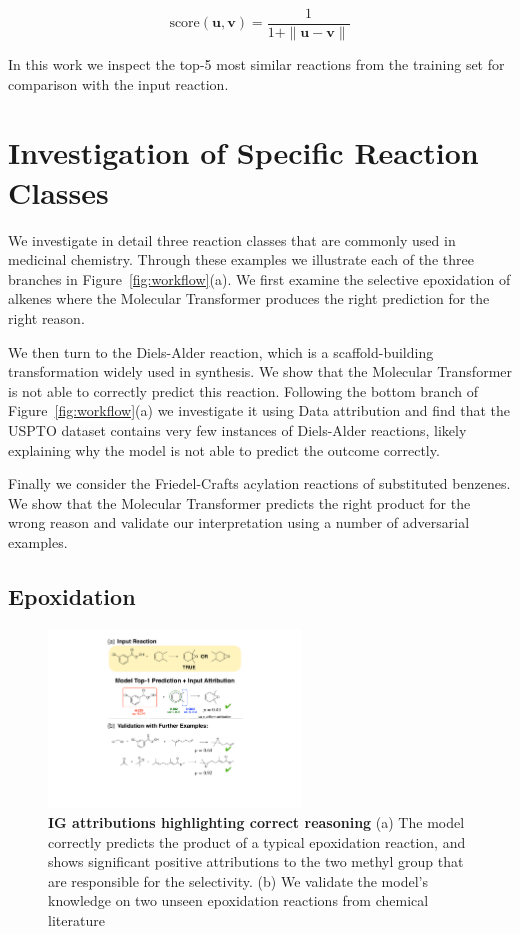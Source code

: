 \begin{equation}
    \textrm{score}(\textbf{u},\textbf{v}) = \frac{1}{1 + \|\textbf{u} - \textbf{v} \|}
\end{equation}

In this work we inspect the top-5 most similar reactions from the training set for comparison with the input reaction.

\section{Investigation of Specific Reaction Classes}

We investigate in detail three reaction classes that are commonly used in medicinal chemistry. Through these examples we illustrate each of the three branches in Figure~\ref{fig:workflow}(a). We first examine the selective epoxidation of alkenes where the Molecular Transformer produces the right prediction for the right reason.

We then turn to the Diels-Alder reaction, which is a scaffold-building transformation widely used in synthesis. We show that the Molecular Transformer is not able to correctly predict this reaction. Following the bottom branch of Figure~\ref{fig:workflow}(a) we investigate it using Data attribution and find that the USPTO dataset contains very few instances of Diels-Alder reactions, likely explaining why the model is not able to predict the outcome correctly.

Finally we consider the Friedel-Crafts acylation reactions of substituted benzenes. We show that the Molecular Transformer predicts the right product for the wrong reason and validate our interpretation using a number of adversarial examples.

\subsection{Epoxidation}

\begin{figure}[ht!]
    \centering
    \includegraphics[width=0.6\textwidth]{Chapters/Transformer/Figs/epoxidation.pdf}
    \caption{\label{fig:epoxide} \textbf{IG attributions highlighting correct reasoning} (a) The model correctly predicts the product of a typical epoxidation reaction, and shows significant positive attributions to the two methyl group that are responsible for the selectivity. (b) We validate the model's knowledge on two unseen epoxidation reactions from chemical literature~\cite{Lluch1993}}
\end{figure}

